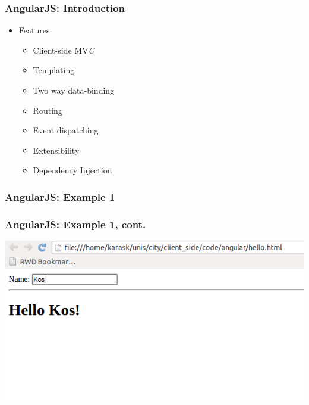 \documentclass{beamer}
\begin{document}
\begin{frame}[fragile]\frametitle{AngularJS: Introduction} 
  
  \begin{itemize}
    \item Features:
    \begin{itemize}
      \item Client-side MV\textit{C}
      \item Templating
      \item Two way data-binding
      \item Routing
      \item Event dispatching
      \item Extensibility
      \item Dependency Injection
    \end{itemize}
  \end{itemize}
\end{frame}



\begin{frame}[fragile]\frametitle{AngularJS: Example 1} 

  
  
\end{frame}




\begin{frame}[fragile]\frametitle{AngularJS: Example 1, cont.} 

  \begin{center}
    \includegraphics[scale=0.50]{images/hello_angular.png}    
  \end{center}

\end{frame}
\end{document}

